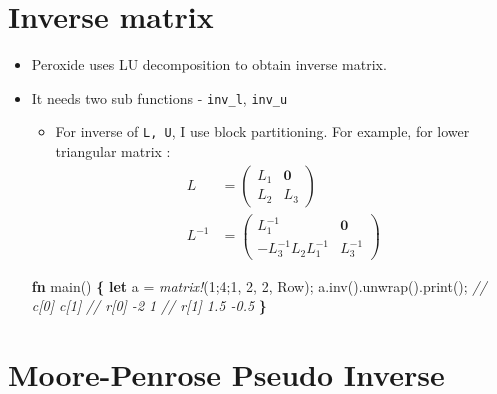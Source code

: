 \documentclass[]{book}
\newenvironment{Shaded}{\begin{snugshade}}{\end{snugshade}}
\newcommand{\CommentTok}[1]{\textcolor[rgb]{0.56,0.35,0.01}{\textit{#1}}}
\newcommand{\DecValTok}[1]{\textcolor[rgb]{0.00,0.00,0.81}{#1}}
\newcommand{\KeywordTok}[1]{\textcolor[rgb]{0.13,0.29,0.53}{\textbf{#1}}}
\newcommand{\NormalTok}[1]{#1}
\newcommand{\OperatorTok}[1]{\textcolor[rgb]{0.81,0.36,0.00}{\textbf{#1}}}
\newcommand{\PreprocessorTok}[1]{\textcolor[rgb]{0.56,0.35,0.01}{\textit{#1}}}
\providecommand{\tightlist}{%
  \setlength{\itemsep}{0pt}\setlength{\parskip}{0pt}}
\begin{document}
\hypertarget{inverse-matrix}{%
\section{Inverse matrix}\label{inverse-matrix}}

\begin{itemize}
\tightlist
\item
  Peroxide uses LU decomposition to obtain inverse matrix.
\item
  It needs two sub functions - \texttt{inv\_l}, \texttt{inv\_u}

  \begin{itemize}
  \tightlist
  \item
    For inverse of \texttt{L,\ U}, I use block partitioning. For example, for lower triangular matrix :
    \[\begin{aligned}
      L &= \begin{pmatrix}
      L_1 & \mathbf{0} \\
      L_2 & L_3 
      \end{pmatrix} \\
      L^{-1} &= \begin{pmatrix}
      L_1^{-1} & \mathbf{0} \\
      -L_3^{-1}L_2 L_1^{-1} & L_3^{-1}
      \end{pmatrix}
      \end{aligned}
      \]
  \end{itemize}

\begin{Shaded}
\begin{Highlighting}[]
\KeywordTok{fn}\NormalTok{ main() }\OperatorTok{\{}
    \KeywordTok{let}\NormalTok{ a = }\PreprocessorTok{matrix!}\NormalTok{(}\DecValTok{1}\NormalTok{;}\DecValTok{4}\NormalTok{;}\DecValTok{1}\NormalTok{, }\DecValTok{2}\NormalTok{, }\DecValTok{2}\NormalTok{, Row);}
\NormalTok{    a.inv().unwrap().print();}
    \CommentTok{//      c[0] c[1]}
    \CommentTok{// r[0]   -2    1}
    \CommentTok{// r[1]  1.5 -0.5}
\OperatorTok{\}}
\end{Highlighting}
\end{Shaded}
\end{itemize}

\hypertarget{moore-penrose-pseudo-inverse}{%
\section{Moore-Penrose Pseudo Inverse}\label{moore-penrose-pseudo-inverse}}
\end{document}
